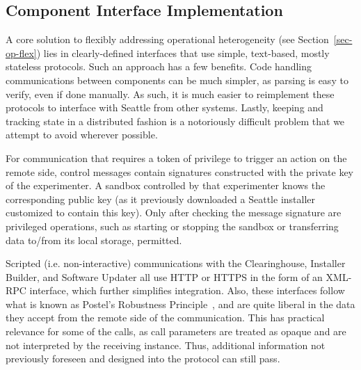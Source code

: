 %



\subsection{Component Interface Implementation}

A core solution to flexibly addressing operational heterogeneity (see
Section~\ref{sec-op-flex}) lies in clearly-defined interfaces
that use simple, text-based, mostly stateless protocols.
Such an approach has a few benefits. Code handling communications between
components can be much simpler, as parsing is easy to verify,
even if done manually. As such, it is much easier to reimplement these protocols
to interface with Seattle from other systems. Lastly, keeping
and tracking state in a distributed fashion is a notoriously
difficult problem that we attempt to avoid wherever possible.

For communication that requires a token of privilege to trigger
an action on the remote side, control messages contain signatures
constructed with the private key of the experimenter. A
sandbox controlled by that experimenter knows the
corresponding public key (as it previously downloaded a Seattle installer
customized to contain this key). Only after checking
the message signature are privileged operations, such as starting
or stopping the sandbox or transferring data to/from its
local storage, permitted.

Scripted (i.e. non-interactive) communications with the
Clearinghouse, Installer Builder, and Software Updater all
use \gls{HTTP} or \gls{HTTPS} in the form of an
\acrshort{XML}-\acrshort{RPC} interface, which further simplifies
integration. Also, these interfaces
follow what is known as Postel's Robustness
Principle~\cite[\S2.10]{rfc793}, and are quite liberal in the
data they accept from the remote side of the communication.
This has practical relevance for some of the calls, as
call parameters are treated as opaque and are not
interpreted by the receiving instance. Thus, additional
information not previously foreseen and designed into the
protocol can still pass.
